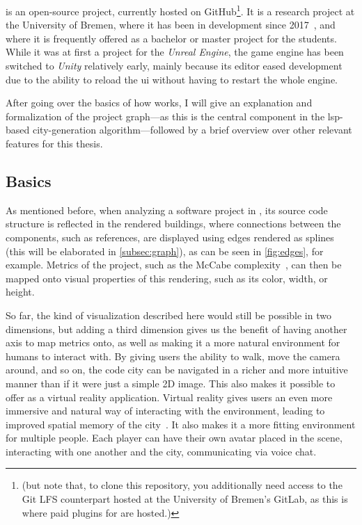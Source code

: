 \documentclass[../thesis]{subfiles}
\begin{document}
\SEE{} is an open-source project, currently hosted on GitHub\footnote{ (but note that, to clone this repository, you additionally need access to the Git LFS counterpart hosted at the University of Bremen's GitLab, as this is where paid plugins for \SEE{} are hosted.)}.
It is a research project at the University of Bremen, where it has been in development since 2017~\cite{ganser2017}, and where it is frequently offered as a bachelor or master project for the students.
While it was at first a project for the \emph{Unreal Engine}, the game engine has been switched to \emph{Unity} relatively early, mainly because its editor eased development due to the ability to reload the \gls*{ui} without having to restart the whole engine.

After going over the basics of how \SEE{} works, I will give an explanation and formalization of the project graph---as this is the central component in the \gls{lsp}-based \gls{city}-generation algorithm---followed by a brief overview over other relevant features for this thesis.

\subsection{Basics}
As mentioned before, when analyzing a software project in \SEE{}, its source code structure is reflected in the rendered buildings, where connections between the components, such as references, are displayed using edges rendered as splines (this will be elaborated in \cref{subsec:graph}), as can be seen in \cref{fig:edges}, for example.
Metrics of the project, such as the McCabe complexity~\cite{mccabe}, can then be mapped onto visual properties of this rendering, such as its color, width, or height.

So far, the kind of visualization described here would still be possible in two dimensions, but adding a third dimension gives us the benefit of having another axis to map metrics onto, as well as making it a more natural environment for humans to interact with.
By giving users the ability to walk, move the camera around, and so on, the code city can be navigated in a richer and more intuitive manner than if it were just a simple 2D image.
This also makes it possible to offer \SEE{} as a virtual reality application.
Virtual reality gives users an even more immersive and natural way of interacting with the environment, leading to improved spatial memory of the city~\cite[\eg,][]{tavanti2001}.
It also makes it a more fitting environment for multiple people.
Each player can have their own avatar placed in the scene, interacting with one another and the city, communicating via voice chat.
\end{document}

